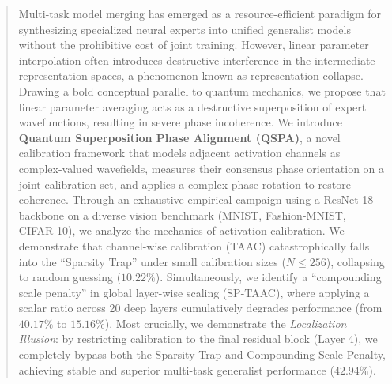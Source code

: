 \documentclass{article}
\begin{document}

\printAffiliationsAndNotice{}

\begin{abstract}
Multi-task model merging has emerged as a resource-efficient paradigm for synthesizing specialized neural experts into unified generalist models without the prohibitive cost of joint training. However, linear parameter interpolation often introduces destructive interference in the intermediate representation spaces, a phenomenon known as representation collapse. Drawing a bold conceptual parallel to quantum mechanics, we propose that linear parameter averaging acts as a destructive superposition of expert wavefunctions, resulting in severe phase incoherence. We introduce \textbf{Quantum Superposition Phase Alignment (QSPA)}, a novel calibration framework that models adjacent activation channels as complex-valued wavefields, measures their consensus phase orientation on a joint calibration set, and applies a complex phase rotation to restore coherence. Through an exhaustive empirical campaign using a ResNet-18 backbone on a diverse vision benchmark (MNIST, Fashion-MNIST, CIFAR-10), we analyze the mechanics of activation calibration. We demonstrate that channel-wise calibration (TAAC) catastrophically falls into the ``Sparsity Trap'' under small calibration sizes ($N \le 256$), collapsing to random guessing ($10.22\%$). Simultaneously, we identify a ``compounding scale penalty'' in global layer-wise scaling (SP-TAAC), where applying a scalar ratio across 20 deep layers cumulatively degrades performance (from $40.17\%$ to $15.16\%$). Most crucially, we demonstrate the \textit{Localization Illusion}: by restricting calibration to the final residual block (Layer 4), we completely bypass both the Sparsity Trap and Compounding Scale Penalty, achieving stable and superior multi-task generalist performance ($42.94\%$).
\end{abstract}
\end{document}
